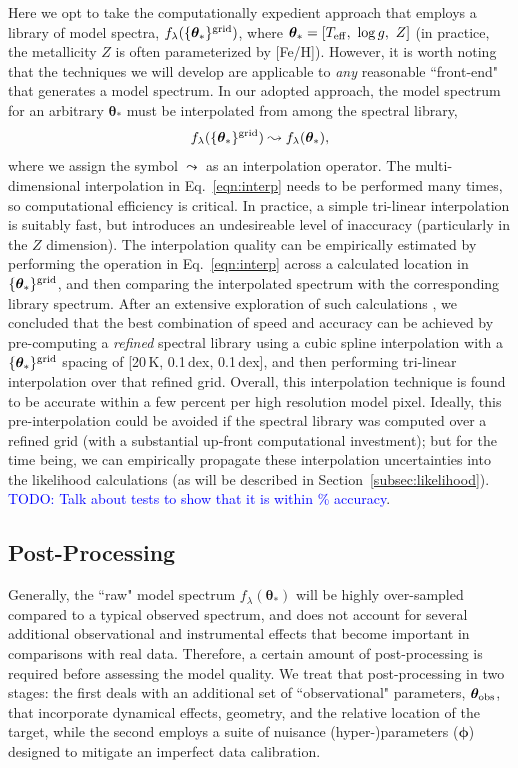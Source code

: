 \documentclass[iop,floatfix]{emulateapj}
\newcommand{\flam}{f_\lambda}
\newcommand{\vt}{ {\bm \theta}}
\newcommand{\vp}{ {\bm \phi}}
\newcommand{\todo}[1]{ \textcolor{blue}{\\TODO: #1}}
\begin{document}
Here we opt to take the computationally expedient approach that employs a library of model spectra, 
$\flam(\{\vt_{\ast}\}^{\rm grid})$, where $\vt_{\ast} = [T_{\rm eff}, \,\, \log{g}, \,\, Z]$ 
(in practice, the metallicity $Z$ is often parameterized by [Fe/H]).  However, it is worth noting 
that the techniques we will develop are applicable to {\it any} reasonable ``front-end" that 
generates a model spectrum.  In our adopted approach, the model spectrum for an arbitrary 
$\vt_{\ast}$ must be interpolated from among the spectral library, 
\begin{equation}
\flam(\{\vt_{\ast}\}^{\rm grid}) \leadsto \flam(\vt_{\ast}),
\label{eqn:interp}
\end{equation}
where we assign the symbol $\leadsto$ as an interpolation operator.  The multi-dimensional 
interpolation in Eq.~\ref{eqn:interp} needs to be performed many times, so computational efficiency 
is critical.  In practice, a simple tri-linear interpolation is suitably fast, but introduces an 
undesireable level of inaccuracy (particularly in the $Z$ dimension).  The interpolation quality 
can be empirically estimated by performing the operation in Eq.~\ref{eqn:interp} across a 
calculated location in $\{\vt_{\ast}\}^{\rm grid}$, and then comparing the interpolated spectrum 
with the corresponding library spectrum.  After an extensive exploration of such calculations 
\citep[see also][]{husser12}, we concluded that the best combination of speed and accuracy can be 
achieved by pre-computing a {\it refined} spectral library using a cubic spline interpolation with 
a $\{\vt_{\ast}\}^{\rm grid}$ spacing of [20\,K, 0.1\,dex, 0.1\,dex], and then performing 
tri-linear interpolation over that refined grid.  Overall, this interpolation technique is found to 
be accurate within a few percent per high resolution model pixel.  Ideally, this pre-interpolation 
could be avoided if the spectral library was computed over a refined grid (with a substantial 
up-front computational investment); but for the time being, we can empirically propagate these 
interpolation uncertainties into the likelihood calculations (as will be described in 
Section~\ref{subsec:likelihood}).  
\todo{Talk about tests to show that it is within \% accuracy}.


\subsection{Post-Processing} \label{subsec:postprocess}

Generally, the ``raw" model spectrum $\flam(\vt_{\ast})$ will be highly over-sampled compared to a 
typical observed spectrum, and does not account for several additional observational and 
instrumental effects that become important in comparisons with real data.  Therefore, a certain 
amount of post-processing is required before assessing the model quality.  We treat that 
post-processing in two stages: the first deals with an additional set of ``observational" 
parameters, $\vt_{\rm obs}$, that incorporate dynamical effects, geometry, and the relative 
location of the target, while the second employs a suite of nuisance (hyper-)parameters ($\vp$) 
designed to mitigate an imperfect data calibration.
\end{document}
